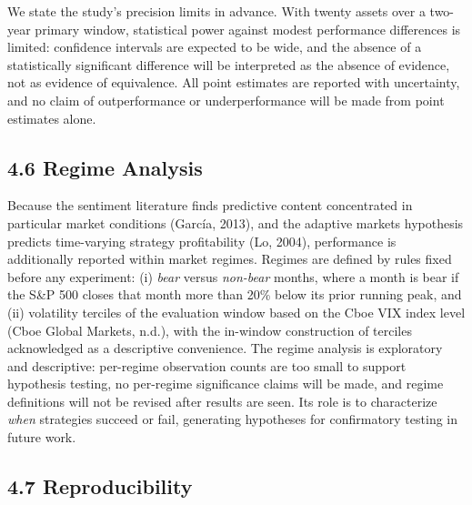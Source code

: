 \documentclass[
  12pt,
]{article}
\begin{document}
We state the study's precision limits in advance. With twenty assets
over a two-year primary window, statistical power against modest
performance differences is limited: confidence intervals are expected to
be wide, and the absence of a statistically significant difference will
be interpreted as the absence of evidence, not as evidence of
equivalence. All point estimates are reported with uncertainty, and no
claim of outperformance or underperformance will be made from point
estimates alone.

\hypertarget{regime-analysis}{%
\subsection{4.6 Regime Analysis}\label{regime-analysis}}

Because the sentiment literature finds predictive content concentrated
in particular market conditions (García, 2013), and the adaptive markets
hypothesis predicts time-varying strategy profitability (Lo, 2004),
performance is additionally reported within market regimes. Regimes are
defined by rules fixed before any experiment: (i) \emph{bear} versus
\emph{non-bear} months, where a month is bear if the S\&P 500 closes
that month more than 20\% below its prior running peak, and (ii)
volatility terciles of the evaluation window based on the Cboe VIX index
level (Cboe Global Markets, n.d.), with the in-window construction of
terciles acknowledged as a descriptive convenience. The regime analysis
is exploratory and descriptive: per-regime observation counts are too
small to support hypothesis testing, no per-regime significance claims
will be made, and regime definitions will not be revised after results
are seen. Its role is to characterize \emph{when} strategies succeed or
fail, generating hypotheses for confirmatory testing in future work.

\hypertarget{reproducibility}{%
\subsection{4.7 Reproducibility}\label{reproducibility}}
\end{document}
